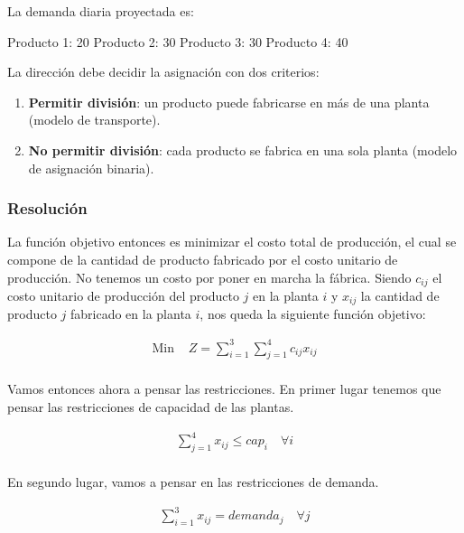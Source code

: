 \documentclass[12pt]{article}
\begin{document}
La demanda diaria proyectada es:
\begin{center}
    Producto 1: 20 \hspace{1em} Producto 2: 30 \hspace{1em} Producto 3: 30 \hspace{1em} Producto 4: 40
\end{center}

La dirección debe decidir la asignación con dos criterios:
\begin{enumerate}[label=\alph*)]
    \item \textbf{Permitir división}: un producto puede fabricarse en más de una planta (modelo de transporte).
    \item \textbf{No permitir división}: cada producto se fabrica en una sola planta (modelo de asignación binaria).
\end{enumerate}

\subsubsection{Resolución}

La función objetivo entonces es minimizar el costo total de producción, el cual se compone de la cantidad de producto fabricado por el costo unitario de producción. No tenemos un costo por poner en marcha la fábrica. Siendo $c_{ij}$ el costo unitario de producción del producto $j$ en la planta $i$ y $x_{ij}$ la cantidad de producto $j$ fabricado en la planta $i$, nos queda la siguiente función objetivo:

\begin{align*}
    \text{Min } & Z = \sum_{i=1}^{3} \sum_{j=1}^{4} c_{ij} x_{ij} \\
\end{align*}

Vamos entonces ahora a pensar las restricciones. En primer lugar tenemos que pensar las restricciones de capacidad de las plantas.

\begin{align*}
    \sum_{j=1}^{4} x_{ij} \le cap_i \quad \forall i \\
\end{align*}

En segundo lugar, vamos a pensar en las restricciones de demanda.

\begin{align*}
    \sum_{i=1}^{3} x_{ij} = demanda_j \quad \forall j \\
\end{align*}
\end{document}

